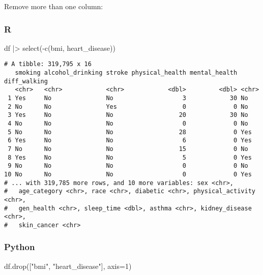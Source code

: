 \documentclass[
  letterpaper,
  DIV=11,
  numbers=noendperiod]{scrreprt}
\newenvironment{Shaded}{\begin{snugshade}}{\end{snugshade}}
\newcommand{\DecValTok}[1]{\textcolor[rgb]{0.68,0.00,0.00}{#1}}
\newcommand{\FunctionTok}[1]{\textcolor[rgb]{0.28,0.35,0.67}{#1}}
\newcommand{\NormalTok}[1]{\textcolor[rgb]{0.00,0.46,0.62}{#1}}
\newcommand{\OperatorTok}[1]{\textcolor[rgb]{0.37,0.37,0.37}{#1}}
\newcommand{\SpecialCharTok}[1]{\textcolor[rgb]{0.37,0.37,0.37}{#1}}
\newcommand{\StringTok}[1]{\textcolor[rgb]{0.13,0.47,0.30}{#1}}
\begin{document}
Remove more than one column:

\hypertarget{r-22}{%
\subsubsection{R}\label{r-22}}

\begin{Shaded}
\begin{Highlighting}[]
\NormalTok{df }\SpecialCharTok{|\textgreater{}} \FunctionTok{select}\NormalTok{(}\SpecialCharTok{{-}}\FunctionTok{c}\NormalTok{(bmi, heart\_disease))}
\end{Highlighting}
\end{Shaded}

\begin{verbatim}
# A tibble: 319,795 x 16
   smoking alcohol_drinking stroke physical_health mental_health diff_walking
   <chr>   <chr>            <chr>            <dbl>         <dbl> <chr>       
 1 Yes     No               No                   3            30 No          
 2 No      No               Yes                  0             0 No          
 3 Yes     No               No                  20            30 No          
 4 No      No               No                   0             0 No          
 5 No      No               No                  28             0 Yes         
 6 Yes     No               No                   6             0 Yes         
 7 No      No               No                  15             0 No          
 8 Yes     No               No                   5             0 Yes         
 9 No      No               No                   0             0 No          
10 No      No               No                   0             0 Yes         
# ... with 319,785 more rows, and 10 more variables: sex <chr>,
#   age_category <chr>, race <chr>, diabetic <chr>, physical_activity <chr>,
#   gen_health <chr>, sleep_time <dbl>, asthma <chr>, kidney_disease <chr>,
#   skin_cancer <chr>
\end{verbatim}

\hypertarget{python-22}{%
\subsubsection{Python}\label{python-22}}

\begin{Shaded}
\begin{Highlighting}[]
\NormalTok{df.drop([}\StringTok{"bmi"}\NormalTok{, }\StringTok{"heart\_disease"}\NormalTok{], axis}\OperatorTok{=}\DecValTok{1}\NormalTok{)}
\end{Highlighting}
\end{Shaded}
\end{document}
